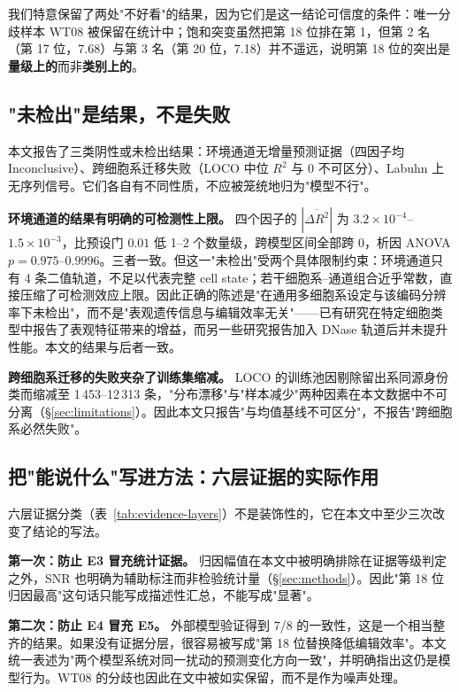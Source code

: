 我们特意保留了两处"不好看"的结果，因为它们是这一结论可信度的条件：唯一分歧样本 WT08 被保留在统计中；饱和突变虽然把第 18 位排在第 1，但第 2 名（第 17 位，7.68）与第 3 名（第 20 位，7.18）并不遥远，说明第 18 位的突出是\textbf{量级上的}而非\textbf{类别上的}。

\subsection{"未检出"是结果，不是失败}

本文报告了三类阴性或未检出结果：环境通道无增量预测证据（四因子均 Inconclusive）、跨细胞系迁移失败（LOCO 中位 $R^{2}$ 与 0 不可区分）、Labuhn 上无序列信号。它们各自有不同性质，不应被笼统地归为"模型不行"。

\textbf{环境通道的结果有明确的可检测性上限。} 四个因子的 $|\overline{\Delta R^{2}}|$ 为 $3.2\times10^{-4}$--$1.5\times10^{-3}$，比预设门 $0.01$ 低 1--2 个数量级，跨模型区间全部跨 0，析因 ANOVA $p=0.975$--$0.9996$。三者一致。但这一"未检出"受两个具体限制约束：环境通道只有 4 条二值轨道，不足以代表完整 cell state；若干细胞系--通道组合近乎常数，直接压缩了可检测效应上限。因此正确的陈述是"在通用多细胞系设定与该编码分辨率下未检出"，而不是"表观遗传信息与编辑效率无关"——已有研究在特定细胞类型中报告了表观特征带来的增益\citep{Ito2024NAR,Luboshitz2026TCBB}，而另一些研究报告加入 DNase 轨道后并未提升性能\citep{Wang2019NatCommun}。本文的结果与后者一致。

\textbf{跨细胞系迁移的失败夹杂了训练集缩减。} LOCO 的训练池因剔除留出系同源身份类而缩减至 1\,453--12\,313 条，"分布漂移"与"样本减少"两种因素在本文数据中不可分离（\S\ref{sec:limitations}）。因此本文只报告"与均值基线不可区分"，不报告"跨细胞系必然失败"。

\subsection{把"能说什么"写进方法：六层证据的实际作用}

六层证据分类（表~\ref{tab:evidence-layers}）不是装饰性的，它在本文中至少三次改变了结论的写法。

\textbf{第一次：防止 E3 冒充统计证据。} 归因幅值在本文中被明确排除在证据等级判定之外，SNR 也明确为辅助标注而非检验统计量（\S\ref{sec:methods}）。因此"第 18 位归因最高"这句话只能写成描述性汇总，不能写成"显著"。

\textbf{第二次：防止 E4 冒充 E5。} 外部模型验证得到 7/8 的一致性，这是一个相当整齐的结果。如果没有证据分层，很容易被写成"第 18 位替换降低编辑效率"。本文统一表述为"两个模型系统对同一扰动的预测变化方向一致"，并明确指出这仍是模型行为。WT08 的分歧也因此在文中被如实保留，而不是作为噪声处理。

